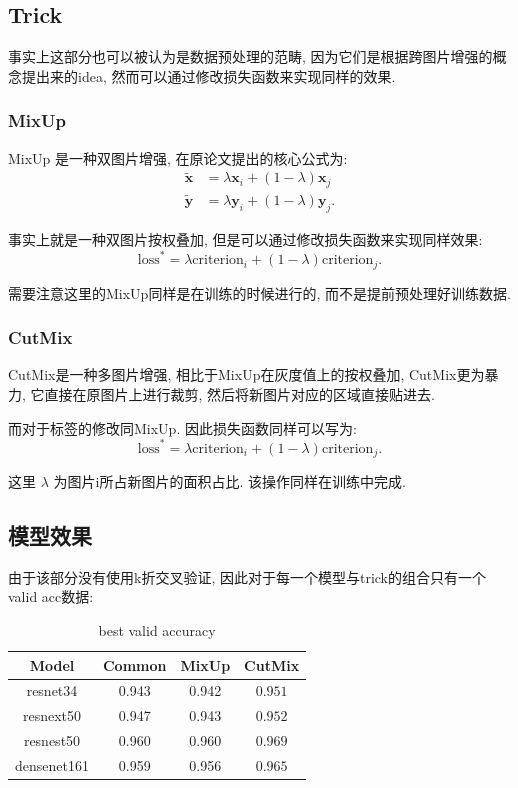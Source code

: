 \documentclass[lang=cn,12pt,a4paper]{elegantpaper}
\begin{document}
\subsection{Trick}
事实上这部分也可以被认为是数据预处理的范畴, 因为它们是根据跨图片增强的概念提出来的idea, 然而可以通过修改损失函数来实现同样的效果.
\subsubsection{MixUp}
MixUp\cite{zhang2018mixup} 是一种双图片增强, 在原论文提出的核心公式为:
\begin{equation*}
\begin{aligned}
    \tilde{\bm{x}} &= \lambda \bm{x}_i + (1 - \lambda)\bm{x}_j\\
    \tilde{\bm{y}} &= \lambda \bm{y}_i + (1 - \lambda)\bm{y}_j.
\end{aligned}
\end{equation*}

事实上就是一种双图片按权叠加, 但是可以通过修改损失函数来实现同样效果:
\begin{equation*}
    \mathrm{loss}^{*} = \lambda \mathrm{criterion}_i + (1 - \lambda) \mathrm{criterion}_j.
\end{equation*}

需要注意这里的MixUp同样是在训练的时候进行的, 而不是提前预处理好训练数据.

\subsubsection{CutMix}
CutMix\cite{yun2019cutmix}是一种多图片增强, 相比于MixUp在灰度值上的按权叠加, CutMix更为暴力, 它直接在原图片上进行裁剪, 然后将新图片对应的区域直接贴进去.

而对于标签的修改同MixUp. 因此损失函数同样可以写为:
\begin{equation*}
    \mathrm{loss}^{*} = \lambda \mathrm{criterion}_i + (1 - \lambda) \mathrm{criterion}_j.
\end{equation*}

这里 $\lambda$ 为图片i所占新图片的面积占比. 该操作同样在训练中完成.
\subsection{模型效果}
由于该部分没有使用k折交叉验证, 因此对于每一个模型与trick的组合只有一个valid acc数据:
\begin{table}[htbp]
    \centering
    \begin{tabular}{cccc}
    \hline
    Model & Common & MixUp & CutMix\\
    \hline
    resnet34 & 0.943 & 0.942 & $\mathbf{0.951}$\\
    resnext50 & 0.947 & 0.943 & $\mathbf{0.952}$\\
    resnest50 & 0.960 & 0.960 & $\mathbf{0.969}$\\
    densenet161 & 0.959 & 0.956 & $\mathbf{0.965}$\\
    \hline
    \end{tabular}
    \caption{best valid accuracy}
\end{table}
\end{document}
